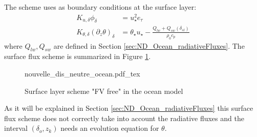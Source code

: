 The scheme uses as boundary conditions at the surface layer:
\begin{equation}
\label{eq:ND_Ocean_boundaryConditionFVfree}
\begin{aligned}
	K_{u,\delta} \phi_{\delta} &=
	u_\star^2 e_\tau
	\\
	K_{\theta, \delta} (\partial_z \theta)_\delta &= 
	\theta_\star u_\star - \frac{Q_{lw} + Q_{sw}(\delta_{sl})}{\rho_0 c_p}
  \end{aligned}
\end{equation}
where $Q_{lw}, Q_{sw}$ are defined in Section
\ref{sec:ND_Ocean_radiativeFluxes}.
The surface flux scheme is summarized in Figure
\ref{fig:ND_Ocean_nouvelle_dis_neutre}.
\begin{figure}
	{nouvelle_dis_neutre_ocean.pdf_tex}
	\caption{Surface layer scheme "FV free" in the ocean model}
	\label{fig:ND_Ocean_nouvelle_dis_neutre}
\end{figure}
As it will be explained
in Section \ref{sec:ND_Ocean_radiativeFluxes} this surface flux scheme
does not correctly take into account the radiative fluxes and the
interval $(\delta_o, z_k)$ needs an evolution equation for $\theta$.

